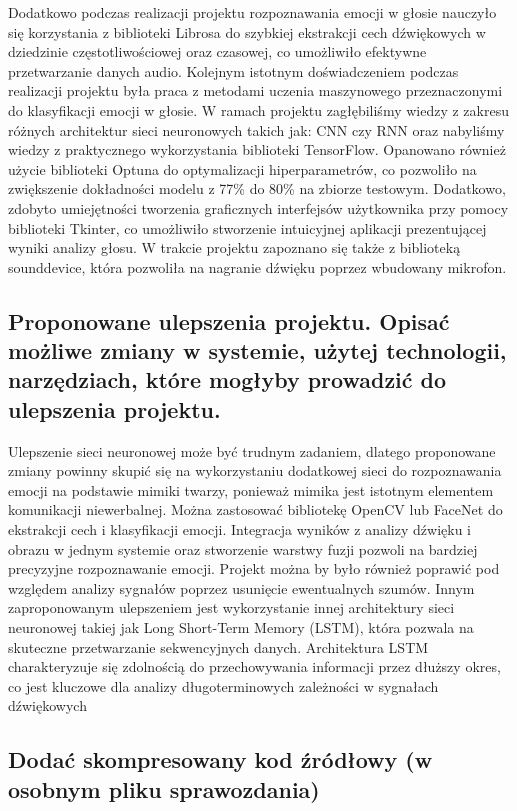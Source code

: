 \documentclass[12pt,titlepage]{article}
\begin{document}
Dodatkowo podczas realizacji projektu rozpoznawania emocji w głosie nauczyło się korzystania z biblioteki Librosa do szybkiej ekstrakcji cech dźwiękowych w dziedzinie częstotliwościowej oraz czasowej, co umożliwiło efektywne przetwarzanie danych audio. Kolejnym istotnym doświadczeniem podczas realizacji projektu była praca z metodami uczenia maszynowego przeznaczonymi do klasyfikacji emocji w głosie. W ramach projektu zagłębiliśmy wiedzy z zakresu różnych architektur sieci neuronowych takich jak: CNN czy RNN oraz nabyliśmy wiedzy z praktycznego wykorzystania biblioteki TensorFlow.
Opanowano również użycie biblioteki Optuna do optymalizacji hiperparametrów, co pozwoliło na zwiększenie dokładności modelu z 77\% do 80\% na zbiorze testowym. Dodatkowo, zdobyto umiejętności tworzenia graficznych interfejsów użytkownika przy pomocy biblioteki Tkinter, co umożliwiło stworzenie intuicyjnej aplikacji prezentującej wyniki analizy głosu.
W trakcie projektu zapoznano się także z biblioteką sounddevice, która pozwoliła na nagranie dźwięku poprzez wbudowany mikrofon.

\subsection{Proponowane ulepszenia projektu. Opisać możliwe zmiany w systemie, użytej technologii, narzędziach, które mogłyby prowadzić do ulepszenia projektu.}
Ulepszenie sieci neuronowej może być trudnym zadaniem, dlatego proponowane zmiany powinny skupić się na wykorzystaniu dodatkowej sieci do rozpoznawania emocji na podstawie mimiki twarzy, ponieważ mimika jest istotnym elementem komunikacji niewerbalnej. Można zastosować bibliotekę OpenCV lub FaceNet do ekstrakcji cech i klasyfikacji emocji. Integracja wyników z analizy dźwięku i obrazu w jednym systemie oraz stworzenie warstwy fuzji pozwoli na bardziej precyzyjne rozpoznawanie emocji.
Projekt można by było również poprawić pod względem analizy sygnałów poprzez usunięcie ewentualnych szumów.
Innym zaproponowanym ulepszeniem jest wykorzystanie innej architektury sieci neuronowej takiej jak Long Short-Term Memory (LSTM), która pozwala na skuteczne przetwarzanie sekwencyjnych danych. Architektura LSTM charakteryzuje się zdolnością do przechowywania informacji przez dłuższy okres, co jest kluczowe dla analizy długoterminowych zależności w sygnałach dźwiękowych
\subsection{Dodać skompresowany kod źródłowy (w osobnym pliku sprawozdania)}
\end{document}

